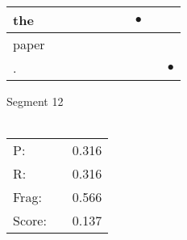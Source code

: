 \documentclass[landscape]{article}
\newcommand{\ssp}{\hspace{2pt}}
\newcommand{\mex}{\cellcolor{g}$\bullet$}
\begin{document}
\begin{tabular}{|l|p{10pt}|p{10pt}|p{10pt}|p{10pt}|p{10pt}|p{10pt}|p{10pt}|p{10pt}|p{10pt}|}
\hline
\ssp \cellcolor{ref6}the \ssp&\hspace{2pt}&\hspace{2pt}&\hspace{2pt}&\hspace{2pt}&\hspace{2pt}&\hspace{2pt}&\hspace{2pt}\mex&\hspace{2pt}&\hspace{2pt}\\
\hline
\ssp paper \ssp&\hspace{2pt}&\hspace{2pt}&\hspace{2pt}&\hspace{2pt}&\hspace{2pt}&\hspace{2pt}&\hspace{2pt}&\hspace{2pt}&\hspace{2pt}\\
\hline
\ssp \cellcolor{ref8}. \ssp&\hspace{2pt}&\hspace{2pt}&\hspace{2pt}&\hspace{2pt}&\hspace{2pt}&\hspace{2pt}&\hspace{2pt}&\hspace{2pt}&\hspace{2pt}\mex\\
\hline
\end{tabular}

\vspace{6pt}
\noindent Segment 12\\\\
\noindent\begin{tabular}{lm{12pt}r}
\hline
P:&&0.316\\
R:&&0.316\\
Frag:&&0.566\\
Score:&&0.137\\
\end{tabular}

\newpage
\end{document}
